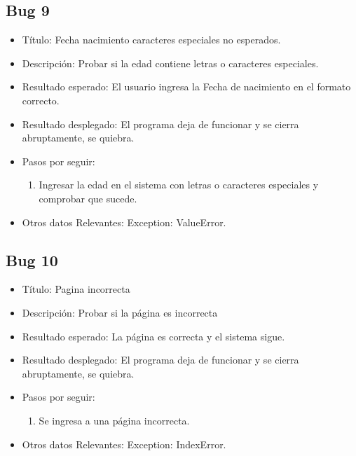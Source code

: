 \documentclass[conference]{IEEEtran}
\begin{document}
\subsection*{Bug 9}
\begin{itemize}
\item Título: Fecha nacimiento caracteres especiales no esperados.

\item Descripción: Probar si la edad contiene letras o caracteres especiales.

\item Resultado esperado: El usuario ingresa la Fecha de nacimiento en el formato correcto.

\item Resultado desplegado: El programa deja de funcionar y se cierra abruptamente, se quiebra. 

\item Pasos por seguir: 
\begin{enumerate}
\item Ingresar la edad en el sistema con letras o caracteres especiales y comprobar que sucede.
\end{enumerate}
\item Otros datos Relevantes: Exception: ValueError.
\end{itemize}


\subsection*{Bug 10}
\begin{itemize}
\item Título: Pagina incorrecta

\item Descripción: Probar si la página es incorrecta

\item Resultado esperado: La página es correcta y el sistema sigue.

\item Resultado desplegado: El programa deja de funcionar y se cierra abruptamente, se quiebra. 

\item Pasos por seguir: 
\begin{enumerate}
\item Se ingresa a una página incorrecta.
\end{enumerate}
\item Otros datos Relevantes: Exception: IndexError.
\end{itemize}
\end{document}
